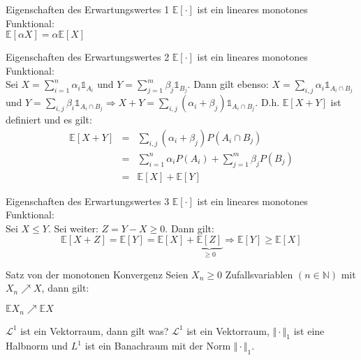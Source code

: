 \documentclass[avery5371,grid,frame]{flashcards} %
\newcommand{\1}{ \mathbb{1} } %
\begin{document}
\begin{flashcard}[Satz]{Eigenschaften des Erwartungswertes 1}
    $\mathbb{E}[\cdot]$ ist ein lineares monotones Funktional: \\
    $\mathbb{E}[\alpha X]=\alpha \mathbb{E}[X]$
\end{flashcard}

\begin{flashcard}[Satz]{Eigenschaften des Erwartungswertes 2}
\tiny  $\mathbb{E}[\cdot]$ ist ein lineares monotones Funktional: \\
  Sei $X=\sum\limits_{i=1}^n\alpha_i \1_{A_i}$ und
    $Y=\sum\limits_{j=1}^m\beta_j\1_{B_j}$. Dann gilt ebenso:
    $X=\sum\limits_{i,j}\alpha_i\1_{A_i\cap B_j}$ und
    $Y=\sum\limits_{i,j}\beta_i\1_{A_i\cap B_j} \Rightarrow
    X+Y=\sum\limits_{i,j}(\alpha_i+\beta_j)\1_{A_i\cap
      B_j}$. D.h. $\mathbb{E}[X+Y]$ ist definiert und es gilt:
    \begin{eqnarray*}
      \mathbb{E}[X+Y]&=& \sum\limits_{i,j}(\alpha_i+\beta_j)P(A_i\cap B_j)\\
      &=&\sum\limits_{i=1}^n\alpha_i P(A_i)+\sum\limits_{j=1}^m\beta_jP(B_j)\\
      &=&\mathbb{E}[X]+\mathbb{E}[Y]
    \end{eqnarray*} 
\end{flashcard}

\begin{flashcard}[Satz]{Eigenschaften des Erwartungswertes 3}
    $\mathbb{E}[\cdot]$ ist ein lineares monotones Funktional: \\
  Sei $X\leq Y$. Sei weiter: $Z=Y-X\geq 0$. Dann gilt:
    \[\mathbb{E}[X+Z]=\mathbb{E}[Y]=\mathbb{E}[X]+\underbrace{\mathbb{E}[Z]}_{\geq
      0} \Rightarrow \mathbb{E}[Y]\geq \mathbb{E}[X]\]
\end{flashcard}

\begin{flashcard}[Satz]{Satz von der monotonen Konvergenz}
  Seien $X_n\geq 0$ Zufallsvariablen $(n \in \mathbb{N})$ mit $X_n \nearrow X$,
  dann gilt:
  \begin{center}
    $\mathbb{E}X_n \nearrow \mathbb{E}X$
  \end{center}
\end{flashcard}

\begin{flashcard}[Satz]{  $\mathcal{L}^1$ ist ein Vektorraum, dann gilt was?}
  $\mathcal{L}^1$ ist ein Vektorraum, $\Vert \cdot \Vert_1$ ist eine Halbnorm und $L^1$ ist ein Banachraum mit der Norm $\Vert \cdot \Vert_1$.
\end{flashcard}
\end{document}
